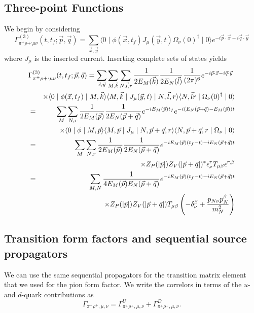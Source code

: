 \documentclass[12pt]{article}
\newcommand{\pdotx}{\vec{p} \cdot \vec{x}}
\newcommand{\qdoty}{\vec{q} \cdot \vec{y}}
\begin{document}
\subsection{Three-point Functions}
We begin by considering
\begin{equation}
\Gamma^{(3)}_{\pi^+ \rho+^, \mu\nu}(t, t_f; \vec{p}, \vec{q}) = 
\sum_{\vec{x}, \vec{y}} \langle 0 \mid \phi(\vec{x}, t_f)
J_{\mu}(\vec{y}, t)
\Omega_{\nu}(0)^{\dagger} \mid 0 \rangle e^{-i\pdotx - i \qdoty}
\end{equation}
where $J_{\mu}$ is the inserted current.  Inserting complete sets of
states yields
\begin{eqnarray}
\lefteqn{\Gamma^{(3)}_{\pi^+ \rho+^, \mu\nu}(t, t_f; \vec{p}, \vec{q}) 
= \sum_{\vec{x}, \vec{y}} \sum_{M,\vec{k}} \sum_{N, \vec{l}, r}
\frac{1}{2 E_M(\vec{k})} \frac{1}{2 E_N(\vec{l})}
\frac{1}{(2\pi)^6}e^{-i\pdotx -i \qdoty}} & & \nonumber \\
& & \times
\langle 0 \mid \phi(\vec{x}, t_f) \mid M,\vec{k} \rangle \langle M,
\vec{k} \mid J_{\mu}(\vec{y},t) \mid N, \vec{l},r\rangle \langle N,
\vec{l} r \mid \Omega_{\nu}(0)^{\dagger} \mid 0 \rangle\nonumber\\
& = & \sum_M \sum_{N,r} \frac{1}{2 E_M(\vec{p})} \frac{1}{2
  E_N(\vec{p} + \vec{q})} e^{-i E_M(\vec{p}) t_f} e^{-i(E_N(\vec{p} +
  \vec{q}) - E_M(\vec{p})) t}\nonumber \\
& & \times \langle 0 \mid \phi \mid M, \vec{p}
\rangle \langle M,\vec{p} \mid J_\mu \mid N, \vec{p} + \vec{q}, r
\rangle \langle N, \vec{p} + \vec{q}, r \mid \Omega_{\nu} \mid 0
\rangle \nonumber \\
& = & \sum_M \sum_{N,r} \frac{1}{2 E_M(\vec{p})}\frac{1}{2 E_N(\vec{p}
  + \vec{q})} e^{-iE_M(\vec{p}) (t_f - t) -i E_N(\vec{p} +
  \vec{q})t}\nonumber \\
& & \times Z_P(|\vec{p}|) Z_V(|\vec{p} + \vec{q}|)^* \epsilon^r_{\nu}
T_{\mu\beta} \epsilon^{r,\beta} \nonumber \\
& = & \sum_{M,N} \frac{1}{4 E_M(\vec{p}) E_N(\vec{p}+\vec{q})}
e^{-iE_M(\vec{p}) (t_f - t) -i E_N(\vec{p} + \vec{q})t} \nonumber \\
& & \times
Z_P(|\vec{p}|) Z_V(|\vec{p}+\vec{q}|) T_{\mu\beta} \left( -
\delta_\nu^\beta + \frac{p_{N\nu} p_N^\beta}{m_N^2} \right)
%
\end{eqnarray}

\subsection{Transition form factors and sequential source propagators}
We can use the same sequential propagators for the transition matrix
element that we used for the pion form factor.  We write the correlors
in terms of the $u$- and $d$-quark contributions as
\begin{equation}
\Gamma_{\pi^+ \rho^+, \mu,\nu} = \Gamma_{\pi^+ \rho^+, \mu,\nu}^U +
\Gamma_{\pi^+ \rho^+, \mu,\nu}^D.
\end{equation}
\end{document}
